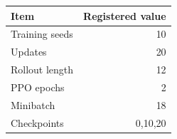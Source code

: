 \begin{tabular}{lr}
\toprule
Item & Registered value \\
\midrule
Training seeds & 10 \\
Updates & 20 \\
Rollout length & 12 \\
PPO epochs & 2 \\
Minibatch & 18 \\
Checkpoints & 0,10,20 \\
\bottomrule
\end{tabular}
